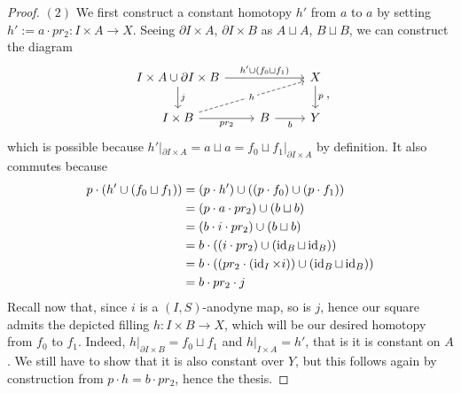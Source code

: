 \documentclass[a4paper,11pt,openany]{scrartcl}
\begin{document}
\begin{proof}
    $(2)$ We first construct a constant homotopy $h'$ from $a$ to $a$ by
    setting $h':=a\cdot pr_2\colon I\times A\rightarrow X$. Seeing $\partial
    I\times A$, $\partial
    I\times B$ as $A\sqcup A$, $B\sqcup B$, we can construct the diagram
    \[\begin{tikzcd}
        {I\times A\cup\partial I\times B} && X \\
        {I\times B} & B & Y
        \arrow["p", from=1-3, to=2-3]
        \arrow["{h'\cup(f_0\sqcup f_1)}", from=1-1, to=1-3]
        \arrow["{j}", from=1-1, to=2-1]
        \arrow["{pr_2}"', from=2-1, to=2-2]
        \arrow["b"', from=2-2, to=2-3]
        \arrow["h"{description}, dashed, from=2-1, to=1-3]
    \end{tikzcd},\]
    which is possible because $h'|_{\partial I\times A}=a\sqcup a=f_0\sqcup
    f_1|_{\partial I\times A}$ by definition. It also commutes because
    \begin{align*}
        p\cdot(h'\cup(f_0\sqcup f_1))&=(p\cdot h')\cup ((p\cdot f_0)\cup(p\cdot
        f_1)) \\
        &=(p\cdot a\cdot pr_2)\cup(b\sqcup b) \\
        &=(b\cdot i\cdot pr_2)\cup(b\sqcup b) \\
        &=b\cdot ((i\cdot pr_2)\cup(\operatorname{id}_B\sqcup\operatorname{id}_B)) \\
        &=b\cdot((pr_2\cdot (\operatorname{id}_I\times i))\cup(\operatorname{id}_B\sqcup\operatorname{id}_B)) \\
        &=b\cdot pr_2\cdot j
    \end{align*}
    Recall now that, since $i$ is a $(I,S)$-anodyne map, so is $j$, hence our
    square admits the depicted filling $h\colon I\times B\rightarrow X$, which
    will be our desired homotopy from $f_0$ to $f_1$. Indeed, $h|_{\partial
    I\times B}=f_0\sqcup f_1$ and $h|_{I\times A}=h'$, that is it is constant on
    $A$. We still have to show that it is also constant over $Y$, but this
    follows again by construction from $p\cdot h=b\cdot pr_2$, hence the thesis.
\end{proof}
\end{document}
